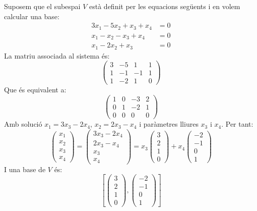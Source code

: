\begin{exemple}
    Suposem que el subespai $V$ està definit per les equacions següents i en volem calcular una base:
    \begin{align*}
        3 x_1 -5x_2 +x_3 + x_4  & = 0 \\
        x_1 - x_2  - x_3 + x_4 & = 0 \\
        x_1-2x_2+x_3 & =0
    \end{align*}
    La matriu associada al sistema és:
    $$
    \begin{pmatrix}
    3 & -5 & 1 & 1 \\ 1 & -1 & -1 & 1 \\ 1 & -2 & 1 & 0
    \end{pmatrix}
    $$
    Que és equivalent a:
    $$
    \begin{pmatrix}
    1 & 0 & -3 & 2 \\
    0 & 1 & -2 & 1 \\
    0 & 0 & 0 & 0
    \end{pmatrix}
    $$
    Amb solució $x_1=3x_3-2x_4$, $x_2=2x_3-x_4$ i paràmetres lliures $x_3$ i $x_4$. Per tant:
    $$
    \begin{pmatrix} x_1\\ x_2\\ x_3\\ x_4 \end{pmatrix}=
    \begin{pmatrix} 3x_3-2x_4\\ 2x_3-x_4\\ x_3\\ x_4 \end{pmatrix}=
    x_3 \begin{pmatrix} 3\\ 2\\ 1 \\ 0 \end{pmatrix}+
    x_4\begin{pmatrix}  -2 \\ -1 \\ 0\\ 1 \end{pmatrix}
    $$
    I una base de $V$ és:
    $$
    \left[\begin{pmatrix} 3\\ 2\\ 1 \\ 0 \end{pmatrix}, 
    \begin{pmatrix}  -2 \\ -1 \\ 0\\ 1 \end{pmatrix}\right]
    $$
\end{exemple}
